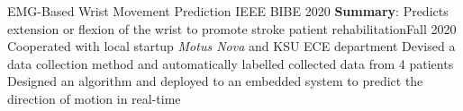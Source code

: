\resumeSubheading
{EMG-Based Wrist Movement Prediction}
{{IEEE BIBE 2020}}
{\textbf{Summary}: Predicts extension or flexion of the wrist to promote stroke patient rehabilitation}{Fall 2020}
\resumeItemListStart
\resumeItem
{Cooperated with local startup \textit{Motus Nova} and KSU ECE department}
\resumeItem
{Devised a data collection method and automatically labelled collected data from
    4 patients}
\resumeItem
{Designed an algorithm and deployed to an embedded system to predict the direction of motion in real-time}
\resumeItemListEnd
